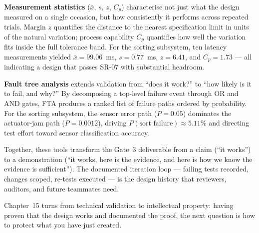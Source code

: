 \textbf{Measurement statistics} ($\bar{x}$, $s$, $z$, $C_p$) characterise not just
what the design measured on a single occasion, but how consistently it performs across
repeated trials.
Margin $z$ quantifies the distance to the nearest specification limit in units of the
natural variation; process capability $C_p$ quantifies how well the variation fits inside
the full tolerance band.
For the sorting subsystem, ten latency measurements yielded $\bar{x} = 99.06$~ms,
$s = 0.77$~ms, $z = 6.41$, and $C_p = 1.73$ --- all indicating a design that passes
SR-07 with substantial headroom.

\textbf{Fault tree analysis} extends validation from ``does it work?'' to ``how likely
is it to fail, and why?''
By decomposing a top-level failure event through OR and AND gates, FTA produces a ranked
list of failure paths ordered by probability.
For the sorting subsystem, the sensor error path ($P = 0.05$) dominates the actuator-jam
path ($P = 0.0012$), driving $P(\text{sort failure}) \approx 5.11\%$ and directing test
effort toward sensor classification accuracy.

Together, these tools transform the Gate~3 deliverable from a claim (``it works'') to a
demonstration (``it works, here is the evidence, and here is how we know the evidence is
sufficient'').
The documented iteration loop --- failing tests recorded, changes scoped, re-tests
executed --- is the design history that reviewers, auditors, and future teammates need.

Chapter~15 turns from technical validation to intellectual property: having proven that
the design works and documented the proof, the next question is how to protect what you
have just created.
